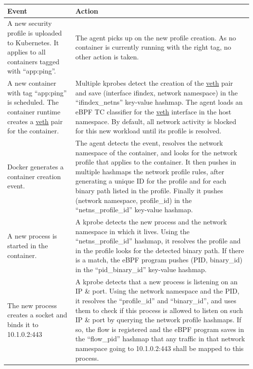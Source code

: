 \begin{table}
  \setlength{\tabcolsep}{5pt}
  \def\arraystretch{1.5}
  \begin{tabular}{|p{}|p{}|}
    \hline \centering Event & \centering Action \tabularnewline

    \hline A new security profile is uploaded to Kubernetes. It applies to all containers tagged with “app:ping”. & The agent picks up on the new profile creation. As no container is currently running with the right tag, no other action is taken. \\

    \hline A new container with tag “app:ping” is scheduled. The container runtime creates a \url{veth} pair for the container. & Multiple kprobes detect the creation of the \url{veth} pair and save (interface ifindex, network namespace) in the “ifindex\_netns” key-value hashmap. The agent loads an eBPF TC classifier for the \url{veth} interface in the host namespace. By default, all network activity is blocked for this new workload until its profile is resolved. \\

    \hline Docker generates a container creation event. & The agent detects the event, resolves the network namespace of the container, and looks for the network profile that applies to the container. It then pushes in multiple hashmaps the network profile rules, after generating a unique ID for the profile and for each binary path listed in the profile. Finally it pushes (network namespace, profile\_id) in the “netns\_profile\_id” key-value hashmap. \\

    \hline A new process is started in the container. & A kprobe detects the new process and the network namespace in which it lives. Using the “netns\_profile\_id” hashmap, it resolves the profile and in the profile looks for the detected binary path. If there is a match, the eBPF program pushes (PID, binary\_id) in the “pid\_binary\_id” key-value hashmap. \\

    \hline The new process creates a socket and binds it to 10.1.0.2:443 & A kprobe detects that a new process is listening on an IP \& port. Using the network namespace and the PID, it resolves the “profile\_id” and “binary\_id”, and uses them to check if this process is allowed to listen on such IP \& port by querying the network profile hashmaps. If so, the flow is registered and the eBPF program saves in the “flow\_pid” hashmap that any traffic in that network namespace going to 10.1.0.2:443 shall be mapped to this process. \\

    \hline
  \end{tabular}
\end{table}

